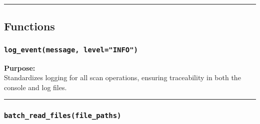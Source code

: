 \begin{center}\rule{0.5\linewidth}{0.5pt}\end{center}

\subsection{Functions}\label{functions}

\subsubsection{\texorpdfstring{\texttt{log\_event(message,\ level="INFO")}}{log\_event(message, level="INFO")}}\label{log_eventmessage-levelinfo}

\begin{Shaded}
\begin{Highlighting}[]
\OperatorTok{=}\NormalTok{):}
\end{Highlighting}
\end{Shaded}

\textbf{Purpose:}\\
Standardizes logging for all scan operations, ensuring traceability in
both the console and log files.

\begin{center}\rule{0.5\linewidth}{0.5pt}\end{center}

\subsubsection{\texorpdfstring{\texttt{batch\_read\_files(file\_paths)}}{batch\_read\_files(file\_paths)}}\label{batch_read_filesfile_paths}

\begin{Shaded}
\begin{Highlighting}[]
\end{Highlighting}
\end{Shaded}

